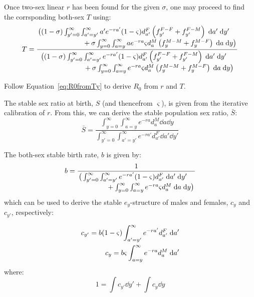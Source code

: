  \FloatBarrier
\label{sec:2sexlinearother}
Once two-sex linear $r$ has been found for the given $\sigma$, one may
proceed to find the corrsponding both-sex $T$ using:
\begin{equation}
T = \frac{\splitfrac{
   \big((1 - \sigma)  \int _{y'=0}^\infty \int_{a'=y'}^\infty 
       a'e^{-ra'} (1-\varsigma)d_{a'}^F \left( f_{y'}^{F-F} + f_{y'}^{F-M}
       \right) \dd a'\dd y'}{ + \sigma \int_{y=0}^\infty \int _{a=y}^\infty a
       e^{-ra}\varsigma d_{a}^M \left( f_{y}^{M-M}+ f_{y}^{M-F} \right) \dd a
       \dd y \big)}}{\splitfrac{\big( (1 - \sigma) \int_{y'=0}^\infty \int_{a'=y'}^\infty e^{-ra'} (1-\varsigma)d_{a'}^F \left(
   f_{y'}^{F-F} + f_{y'}^{F-M} \right) \dd a'\dd y'}{ +\sigma \int _{y=0}^\infty
   \int_{a=y}^\infty e^{-ra} \varsigma d_{a}^M \left( f_{y}^{M-M} + f_{y}^{M-F}
   \right) \dd a \dd y \big)}}
\end{equation}

Follow Equation~\eqref{eq:R0fromTy} to derive $R_0$ from $r$ and $T$. 

The stable sex ratio at birth, $S$ (and thencefrom $\varsigma$), is given from
the iterative calibration of $r$. From this, we can derive the stable
population sex ratio, $\bar{S}$:
\begin{equation}
\bar{S} = \frac{ \int_{y=0}^\infty \int_{a=y}^\infty e^{-ra} d_{a}^M \dd a \dd
y}{\int_{y'=0}^\infty \int_{a'=y'}^\infty e^{-ra'} d_{a'}^F \dd a' \dd
y'}
\end{equation}

The both-sex stable birth rate, $b$ is given by:
\begin{equation}
b = \frac{1}{
            \splitfrac{\big( \int _{y'=0}^\infty
            \int _{a'=y'}^\infty e^{-r a'} (1-\varsigma) d_{a'}^F \dd a' \dd
            y'}{ + \int _{y=0}^\infty \int _{a=y}^\infty
             e^{-r a} \varsigma d_{a}^M \dd a \dd y\big)}  }                   
\end{equation}
which can be used to derive the stable $e_y$-structure of males and females,
$c_y$ and $c_{y'}$, respectively:

\begin{align}
c_{y'} = b (1-\varsigma) \int _{a'=y'}^\infty
e^{-ra'} d_{a'}^F \; \mathrm{d} a' \notag \\
c_{y} = b \varsigma \int _{a=y}^\infty
e^{-ra} d_{a}^M \; \mathrm{d} a'
\label{eq:stablecy}
\end{align}
where:
\begin{equation}
1 = \int c_{y'} \dd y' + \int c_{y} \dd y
\end{equation}
